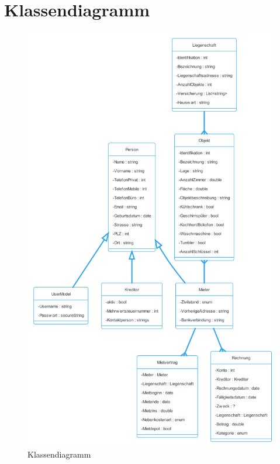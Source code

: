 \section{Klassendiagramm}
\begin{figure}[H]
    \begin{center}
        \includegraphics[width=0.75\linewidth]{content/diagrams/out/classdiagramm/ImmoGlobal.png}
        \caption{Klassendiagramm}
      \end{center}
  \end{figure}